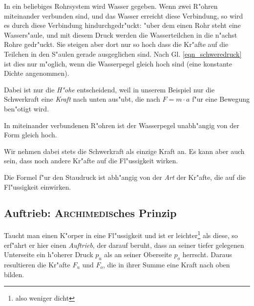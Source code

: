 
In ein beliebiges Rohrsystem wird Wasser gegeben. Wenn zwei R"ohren
miteinander verbunden sind, und das Wasser erreicht diese Verbindung,
so wird es durch diese Verbindung hindurchgedr"uckt: "uber dem einen
Rohr steht eine Wassers"aule, und mit diesem Druck werden die
Wasserteilchen in die n"achst Rohre gedr"uckt. Sie steigen aber dort nur
so hoch dass die Kr"afte auf die Teilchen in den S"aulen gerade
ausgeglichen sind. Nach Gl. \eqref{eqn_schweredruck} ist dies nur
m"oglich, wenn die Wasserpegel gleich hoch sind (eine konstante Dichte
angenommen). 

Dabei ist nur die \emph{H"ohe} entscheidend, weil in unserem Beispiel nur die
Schwerkraft eine \emph{Kraft} nach unten aus"ubt, die nach $F = m \cdot
a$ f"ur eine Bewegung ben"otigt wird.

\begin{Wichtig}
    In miteinander verbundenen
   R"ohren ist der Wasserpegel unabh"angig von der Form gleich hoch.
\end{Wichtig}

Wir nehmen dabei stets die Schwerkraft als einzige Kraft an. Es kann
aber auch sein, dass noch andere Kr"afte auf die Fl"ussigkeit wirken.
\begin{Wichtig}
   Die Formel f"ur den Staudruck ist abh"angig von der \emph{Art} der
   Kr"afte, die auf die Fl"ussigkeit einwirken.
\end{Wichtig}



\subsection{Auftrieb: \textsc{Archimedis}ches Prinzip}
\label{kap_auftrieb:-archimedisches-prinzip}

Taucht man einen K"orper in eine Fl"ussigkeit und ist er
leichter\footnote{also weniger dicht} als diese, so erf"ahrt er hier einen
\emph{Auftrieb}, der darauf beruht, dass an seiner tiefer gelegenen
Unterseite ein h"oherer Druck $p_u$ als an seiner Oberseite $p_o$
herrscht. Daraus resultieren die Kr"afte $F_u$ und $F_o$, die in ihrer
Summe eine Kraft nach oben bilden.

